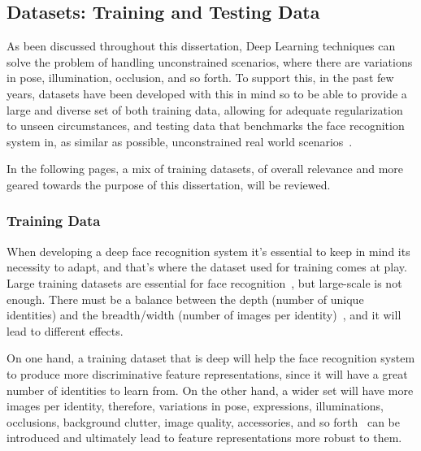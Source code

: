 \documentclass[class=report, crop=false, a4paper, 12pt]{standalone}
\begin{document}
\subsection{Datasets: Training and Testing Data}
\par As been discussed throughout this dissertation, Deep Learning techniques can solve the problem of handling unconstrained scenarios, where there are variations in pose, illumination, occlusion, and so forth. To support this, in the past few years, datasets have been developed with this in mind so to be able to provide a large and diverse set of both training data, allowing for adequate regularization to unseen circumstances, and testing data that benchmarks the face recognition system in, as similar as possible, unconstrained real world scenarios~\autocite{duElementsEndtoendDeep2022}. 

\vspace{\baselineskip}
In the following pages, a mix of training datasets, of overall relevance and more geared towards the purpose of this dissertation, will be reviewed.

\subsubsection{\large Training Data}
\par When developing a deep face recognition system it's essential to keep in mind its necessity to adapt, and that's where the dataset used for training comes at play. Large training datasets are essential for face recognition~\autocite{parkhiDeepFaceRecognition2015}, but large-scale is not enough. There must be a balance between the depth (number of unique identities) and the breadth/width (number of images per identity)~\autocite{bansalDonTsCNNbased2017, caoVGGFace2DatasetRecognising2018}, and it will lead to different effects. 
\par On one hand, a training dataset that is deep will help the face recognition system to produce more discriminative feature representations, since it will have a great number of identities to learn from. On the other hand, a wider set will have more images per identity, therefore, variations in pose, expressions, illuminations, occlusions, background clutter, image quality, accessories, and so forth~\autocite{baeDigiFace1MMillionDigital2023} can be introduced and ultimately lead to feature representations more robust to them.

\end{document}
